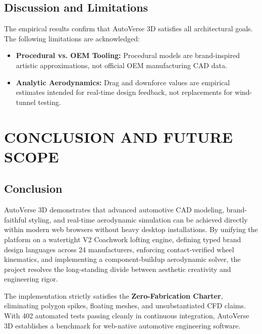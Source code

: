 \documentclass[12pt,a4paper]{report}
\begin{document}
\section{Discussion and Limitations}
The empirical results confirm that AutoVerse 3D satisfies all architectural goals. The following limitations are acknowledged:
\begin{itemize}
    \item \textbf{Procedural vs. OEM Tooling:} Procedural models are brand-inspired artistic approximations, not official OEM manufacturing CAD data.
    \item \textbf{Analytic Aerodynamics:} Drag and downforce values are empirical estimates intended for real-time design feedback, not replacements for wind-tunnel testing.
\end{itemize}

\chapter{CONCLUSION AND FUTURE SCOPE}

\section{Conclusion}
AutoVerse 3D demonstrates that advanced automotive CAD modeling, brand-faithful styling, and real-time aerodynamic simulation can be achieved directly within modern web browsers without heavy desktop installations. By unifying the platform on a watertight V2 Coachwork lofting engine, defining typed brand design languages across 24 manufacturers, enforcing contact-verified wheel kinematics, and implementing a component-buildup aerodynamic solver, the project resolves the long-standing divide between aesthetic creativity and engineering rigor.

The implementation strictly satisfies the \textbf{Zero-Fabrication Charter}, eliminating polygon spikes, floating meshes, and unsubstantiated CFD claims. With 402 automated tests passing cleanly in continuous integration, AutoVerse 3D establishes a benchmark for web-native automotive engineering software.
\end{document}
